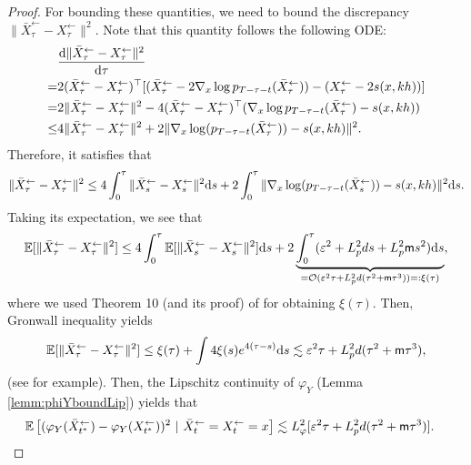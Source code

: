 \begin{proof}
For bounding these quantities, we need to bound the discrepancy $\|\bar{X}_{\tau}^\leftarrow - {X}_{\tau}^\leftarrow\|^2$.  
Note that this quantity follows the following ODE: 
\begin{align}
& \frac{{\textnormal{d}} \|\bar{X}_{\tau}^\leftarrow - {X}_{\tau}^\leftarrow\|^2 }{{\textnormal{d}} \tau} \\
= & 2(\bar{X}_{\tau}^\leftarrow - {X}_{\tau}^\leftarrow)^\top [(\bar{X}_{\tau}^\leftarrow - 2 \nabla_x \log p_{T-\tau-t}(\bar{X}_{\tau}^\leftarrow)) - 
({X}_{\tau}^\leftarrow - 2 s(x,kh))]  \\
= & 2\|\bar{X}_{\tau}^\leftarrow - {X}_{\tau}^\leftarrow\|^2 
- 4(\bar{X}_{\tau}^\leftarrow - {X}_{\tau}^\leftarrow)^\top 
(\nabla_x \log p_{T-\tau-t}(\bar{X}_{\tau}^\leftarrow) - s(x,kh))  \\
\leq 
& 4\|\bar{X}_{\tau}^\leftarrow - {X}_{\tau}^\leftarrow\|^2  + 2 \|\nabla_x \log(p_{T-\tau-t}(\bar{X}_{\tau}^\leftarrow))-s(x,kh)\|^2.
\end{align}
Therefore, it satisfies that 
\begin{align}
\|\bar{X}_{\tau}^\leftarrow - {X}_{\tau}^\leftarrow\|^2
\leq 
4 \int_0^\tau  \|\bar{X}_{s}^\leftarrow - {X}_{s}^\leftarrow\|^2 {\textnormal{d}} s 
+ 
2 \int_0^\tau \|\nabla_x \log(p_{T-\tau-t}(\bar{X}_{s}^\leftarrow))-s(x,kh)\|^2 {\textnormal{d}} s.
\end{align}
Taking its expectation, we see that 
\begin{align}
\mathbb{E}[\|\bar{X}_{\tau}^\leftarrow - {X}_{\tau}^\leftarrow\|^2]
\leq 
4 \int_0^\tau  \mathbb{E}[\|\bar{X}_{s}^\leftarrow - {X}_{s}^\leftarrow\|^2] {\textnormal{d}} s 
+ 
2 \underbrace{\int_0^\tau (\varepsilon^2 + L_p^2 d s + L_p^2 \mathsf{m} s^2) {\textnormal{d}} s}_{={\mathcal{O}}(\varepsilon^2 \tau + L_p^2 d (\tau^2 + \mathsf{m} \tau^3)) =: \xi(\tau)},
\end{align}
where we used Theorem 10 (and its proof) of \cite{chen2023improved} for obtaining $\xi(\tau)$. 
Then, Gronwall inequality yields 
\begin{align}
\mathbb{E}[\|\bar{X}_{\tau}^\leftarrow - {X}_{\tau}^\leftarrow\|^2]
\leq \xi(\tau) + \int 4 \xi(s) e^{4(\tau -s)} {\textnormal{d}} s \lesssim \varepsilon^2 \tau + L_p^2 d(\tau^2 + \mathsf{m} \tau^3),
\end{align}
(see \cite{Mischeler:Note:2019} for example). 
Then, the Lipschitz continuity of $\varphi_Y$ (Lemma \ref{lemm:phiYboundLip}) yields that 
\begin{align}
& \E\left[ (\varphi_Y( \bar{X}_{t^*}^\leftarrow) - \varphi_Y( {X}_{t^*}^\leftarrow))^2  ~|~ \bar{X}_{t}^\leftarrow = {X}_{t}^\leftarrow = x\right] 
\lesssim  L_\varphi^2 [\varepsilon^2 \tau + \Lipdp^2 d(\tau^2 + \mathsf{m} \tau^3)]. %
\end{align}



\end{proof}
